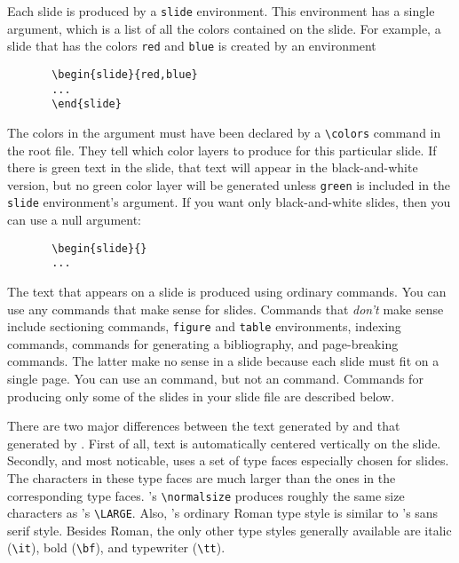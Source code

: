 Each slide is produced by a \xsp{}\mbox{\tt {}slide}\xsp{} environment.  This environment has a single
argument, which is a list of all the colors contained on the slide.
For example, a slide that has the colors \xsp{}\mbox{\tt red}\xsp{}
and \xsp{}\mbox{\tt blue}\xsp{} is created by an environment
\begin{verbatim}
       \begin{slide}{red,blue}
       ...
       \end{slide}
\end{verbatim}
The colors in the argument must have been declared by a
\xsp{}\hbox{\verb"\colors"}\xsp{} command in the root
file.  They tell \SLITEX{} which color layers to produce for this
particular slide.  If there is green text in the slide, that text will
appear in the black-and-white version, but no green color layer will
be generated unless \xsp{}\mbox{\tt green}\xsp{} is included in the
\xsp{}\mbox{\tt slide}\xsp{} environment's argument.  If you want only
black-and-white slides, then you can use a null argument:
\begin{verbatim}
       \begin{slide}{}
       ...
\end{verbatim}

The text that appears on a slide is produced using ordinary \LATEX{}
commands.  You can use any commands that make sense for slides.
Commands that {\it don't\/} make sense include sectioning commands,
\xsp{}\mbox{\tt figure}\xsp{} and \xsp{}\mbox{\tt table}\xsp{}
environments, indexing commands, commands for generating a
bibliography, and page-breaking commands.  The latter make no sense in
a slide because each slide must fit on a single page.  You can use an
\xsp{}\hbox{\verb""}\xsp{} command, but not an
\xsp{}\hbox{\verb""}\xsp{} command.  Commands for producing
only some of the slides in your slide file are described below.

There are two major differences between the text generated by
\SLITEX{} and that generated by \LATEX{}.  First of all, text is
automatically centered vertically on the slide.	 Secondly, and most
noticable, \SLITEX{} uses a set of type  faces
especially chosen for slides.  The characters in these type faces are
much larger than the ones in the corresponding \LATEX{} type faces.
\SLITEX's \xsp{}\hbox{\verb"\normalsize"}\xsp{} produces roughly the
same size characters as \LATEX's \xsp{}\hbox{\verb"\LARGE"}\Xsp.
Also, \SLITEX's ordinary Roman type style is similar to \LATEX's sans
serif style.  Besides Roman, the only other type styles generally
available are italic (\hbox{\verb"\it"}), bold (\hbox{\verb"\bf"}),
and typewriter (\hbox{\verb"\tt"}).

